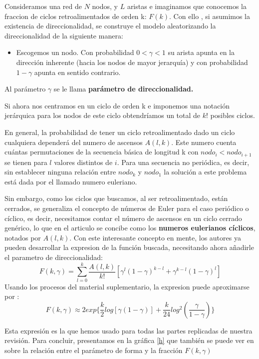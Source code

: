 \documentclass[1p]{elsarticle}
\begin{document}
Consideramos una red de $N$ nodos, y $L$ aristas e imaginamos que conocemos la fraccion de ciclos retroalimentados de orden k: $F(k)$. Con ello , si asumimos la existencia de direccionalidad, se construye el modelo aleatorizando la direccionalidad de la siguiente manera: 
\begin{itemize}
	\item Escogemos un nodo. Con probabilidad $0<\gamma<1$ su arista apunta en la dirección inherente (hacia los nodos de mayor jerarquía) y con probabilidad $1-\gamma$ apunta en sentido contrario.
\end{itemize}
Al parámetro $\gamma$ se le llama \textbf{parámetro de direccionalidad.}

Si ahora nos centramos en un ciclo de orden k e imponemos una notación jerárquica para los nodos de este ciclo obtendríamos un total de $k!$ posibles ciclos. 

En general, la probabilidad de tener un ciclo retroalimentado dado un ciclo cualquiera dependerá del numero de ascensos $A(l,k)$.
Este numero cuenta cuántas permutaciones de la secuencia básica de longitud k con $nodo_{i}<nodo_{i+1}$ se tienen para $l$ valores distintos de $i$. Para una secuencia no periódica, es decir, sin establecer ninguna relación entre $nodo_k$ y $nodo_1$
la solución a este problema está dada por el llamado numero euleriano.

 Sin embargo, como los ciclos que buscamos, al ser retroalimentado, están cerrados, se  generaliza el concepto de números de Euler para el caso periódico o cíclico, es decir, necesitamos contar el número de ascensos en un ciclo cerrado genérico, lo que en el articulo se concibe como los \textbf{numeros eulerianos cíclicos}, notados por $A(l,k)$.
Con este interesante concepto en mente, los autores ya pueden desarrollar la expresion de la función buscada, necesitando ahora añadirle el parametro de direccionalidad:
$$F(k,\gamma)=\sum_{l=0}^{k}\frac{A(l,k)}{k!}[\gamma^l(1-\gamma)^{k-l}+\gamma^{k-l}(1-\gamma)^l]$$
Usando los procesos del material suplementario, la expresion puede aproximarse por :
$$F(k,\gamma)\approx 2exp\{\frac{k}{2}log[\gamma(1-\gamma)]+\frac{k}{24}log^2(\frac{\gamma}{1-\gamma})\}$$

Esta expresión es la que hemos usado para todas las partes replicadas de nuestra revisión.
Para concluir, presentamos en la gráfica \ref{h} que también se puede ver en \cite{arti} sobre la relación entre el parámetro de forma y la fracción $F(k,\gamma)$
\end{document}
